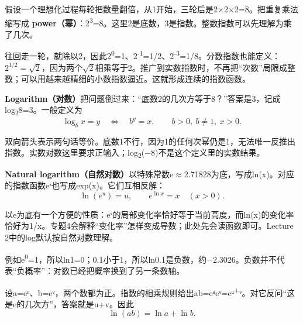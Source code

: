 

假设一个理想化过程每轮把数量翻倍，从1开始，三轮后是2\ensuremath{\times}2\ensuremath{\times}2=8。把重复乘法缩写成 \textbf{power（幂）}：2\textsuperscript{3}=8。这里2是底数，3是指数。整数指数可以先理解为乘了几次。


往回走一轮，就除以2，因此2\textsuperscript{0}=1、2\textsuperscript{-}\textsuperscript{1}=1/2、2\textsuperscript{-}\textsuperscript{3}=1/8。分数指数也能定义：\(2^{1/2}=\sqrt{2}\)，因为两个\(\sqrt{2}\)相乘等于2。推广到实数指数时，不再把“次数”局限成整数；可以用越来越精细的小数指数逼近。这就形成连续的指数函数。


\textbf{Logarithm（对数）}把问题倒过来：“底数2的几次方等于8？”答案是3，记成log\textsubscript{2}8=3。一般定义为
\[
\log_b x=y\quad\Longleftrightarrow\quad b^y=x,
\qquad b>0,\ b\ne1,\ x>0.\tag{M.11}
\]


双向箭头表示两句话等价。底数1不行，因为1的任何次幂仍是1，无法唯一反推出指数。实数对数这里要求正输入；log\textsubscript{2}(\ensuremath{-}8)不是这个定义里的实数结果。





\textbf{Natural logarithm（自然对数）}以特殊常数e\ensuremath{\approx}2.71828为底，写成ln(x)。对应的指数函数eˣ也写成exp(x)。它们互相反解：
\[
\ln(e^u)=u,\qquad e^{\ln x}=x\quad(x>0).\tag{M.12}
\]


以e为底有一个方便的性质：eˣ的局部变化率恰好等于当前高度，而ln(x)的变化率恰好为1/x。专题4会解释“变化率”怎样变成导数；此处先会读函数即可。Lecture 2中的log默认按自然对数理解。






例如e\textsuperscript{0}=1，所以ln1=0；0.1小于1，所以ln0.1是负数，约\ensuremath{-}2.3026。负数并不代表“负概率”：对数已经把概率换到了另一条数轴。








设a=eᵘ、b=eᵛ，两个数都为正。指数的相乘规则给出ab=eᵘeᵛ=eᵘ\textsuperscript{+}ᵛ。对它反问“这是e的几次方”，答案就是u+v。因此
\[
\ln(ab)=\ln a+\ln b.\tag{M.13}
\]


